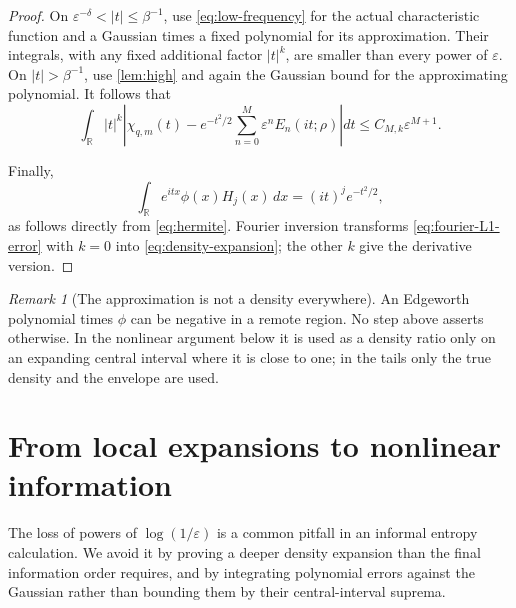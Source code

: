 \documentclass[11pt,a4paper]{article}
\numberwithin{equation}{section}
\theoremstyle{definition}
\theoremstyle{remark}
\newtheorem{remark}[theorem]{Remark}
\newcommand{\R}{\mathbb R}
\newcommand{\eps}{\varepsilon}
\newcommand{\dd}{\,dx}
\begin{document}
\begin{proof}
On $\eps^{-\delta}<|t|\le\beta^{-1}$, use
\eqref{eq:low-frequency} for the actual characteristic function and a
Gaussian times a fixed polynomial for its approximation. Their integrals,
with any fixed additional factor $|t|^k$, are smaller than every power of
$\eps$. On $|t|>\beta^{-1}$, use \cref{lem:high} and again the Gaussian
bound for the approximating polynomial. It follows that
\begin{equation}
 \int_{\R}|t|^k\left|
 \chi_{q,m}(t)-e^{-t^2/2}\sum_{n=0}^{M}\eps^nE_n(it;\rho)
 \right|dt\le C_{M,k}\eps^{M+1}.
 \label{eq:fourier-L1-error}
\end{equation}

Finally,
\[
 \int_{\R}e^{itx}\phi(x)H_j(x)\dd=(it)^je^{-t^2/2},
\]
as follows directly from \eqref{eq:hermite}. Fourier inversion transforms
\eqref{eq:fourier-L1-error} with $k=0$ into
\eqref{eq:density-expansion}; the other $k$ give the derivative version.
\end{proof}

\begin{remark}[The approximation is not a density everywhere]
An Edgeworth polynomial times $\phi$ can be negative in a remote region. No
step above asserts otherwise. In the nonlinear argument below it is used as
a density ratio only on an expanding central interval where it is close to
one; in the tails only the true density and the envelope are used.
\end{remark}

\section{From local expansions to nonlinear information}
\label{sec:transfer}

The loss of powers of $\log(1/\eps)$ is a common pitfall in an informal
entropy calculation. We avoid it by proving a deeper density expansion than
the final information order requires, and by integrating polynomial errors
against the Gaussian rather than bounding them by their central-interval
suprema.
\end{document}
